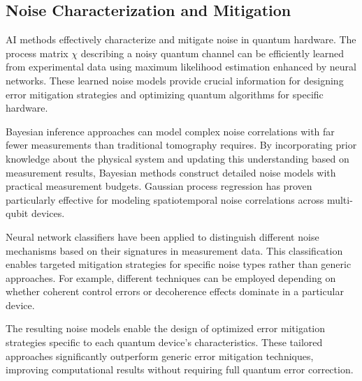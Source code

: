 \subsection{Noise Characterization and Mitigation}

AI methods effectively characterize and mitigate noise in quantum hardware. The process matrix $\chi$ describing a noisy quantum channel can be efficiently learned from experimental data using maximum likelihood estimation enhanced by neural networks. These learned noise models provide crucial information for designing error mitigation strategies and optimizing quantum algorithms for specific hardware.

Bayesian inference approaches can model complex noise correlations with far fewer measurements than traditional tomography requires. By incorporating prior knowledge about the physical system and updating this understanding based on measurement results, Bayesian methods construct detailed noise models with practical measurement budgets. Gaussian process regression has proven particularly effective for modeling spatiotemporal noise correlations across multi-qubit devices.

Neural network classifiers have been applied to distinguish different noise mechanisms based on their signatures in measurement data. This classification enables targeted mitigation strategies for specific noise types rather than generic approaches. For example, different techniques can be employed depending on whether coherent control errors or decoherence effects dominate in a particular device.

The resulting noise models enable the design of optimized error mitigation strategies specific to each quantum device's characteristics. These tailored approaches significantly outperform generic error mitigation techniques, improving computational results without requiring full quantum error correction. 
